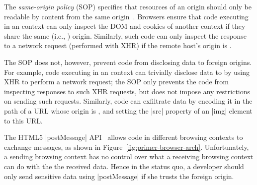 The {\em same-origin policy} (SOP) specifies that resources of an
origin should only be readable by content from the same
origin~\cite{rfc6454, googlehandbook, VanKesteren2012}.  Browsers
ensure that code executing in an  context can only
inspect the DOM and cookies of another context if they share the same
(i.e., ) origin. Similarly, such code can only inspect
the response to a network request (performed with XHR) if the remote
host's origin is .
%
 
The SOP does not, however, prevent code from disclosing data to
foreign origins. For example, code executing in an 
context can trivially disclose data to  by using XHR to
perform a network request; the SOP only prevents the code from
inspecting responses to such XHR requests, but does not impose any
restrictions on sending such requests.
Similarly, code can exfiltrate data by encoding it in the path of a
URL whose origin is , and setting the \js|src| property
of an \js|img| element to this URL.


The HTML5 \js|postMessage| API~\cite{webmessaging}
allows code in different browsing contexts to exchange
messages, as shown in Figure~\ref{fig:primer-browser-arch}.
%
%
Unfortunately, a sending browsing context has no control over what a
receiving browsing context can do with the the received data. Hence in the
status quo, a developer should only send sensitive data using
\js|postMessage| if she trusts the foreign origin.
%

